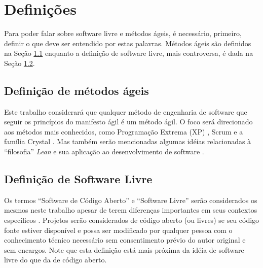 \chapter{Definições}
\label{cap:definicoes}

Para poder falar sobre software livre e métodos ágeis, é necessário,
primeiro, definir o que deve ser entendido por estas palavras. Métodos
ágeis são definidos na Seção \ref{sec:agile-def} enquanto a definição
de software livre, mais controversa, é dada na Seção \ref{sec:os-def}.

\section{Definição de métodos ágeis}
\label{sec:agile-def}

Este trabalho considerará que qualquer método de engenharia de
software que seguir os princípios do manifesto ágil
\cite{AgileManifesto} é um método ágil. O foco será direcionado aos
métodos mais conhecidos, como Programação Extrema (XP) \cite{XP02},
Scrum \cite{Schwaber2004} e a família Crystal \cite{Cockburn2002}. Mas
também serão mencionadas algumas idéias relacionadas à ``filosofia''
\emph{Lean} \cite{Ohno1998} e sua aplicação ao desenvolvimento de
software \cite{Poppendieck2005}.

\section{Definição de Software Livre}
\label{sec:os-def}

Os termos ``Software de Código Aberto'' e ``Software Livre'' serão
considerados os mesmos neste trabalho apesar de terem diferenças
importantes em seus contextos específicos \cite[Ch. 1, Free Versus
Open source]{Fogel2005}. Projetos serão considerados de código aberto
(ou livres) se seu código fonte estiver disponível e possa ser
modificado por qualquer pessoa com o conhecimento técnico necessário
sem consentimento prévio do autor original e sem encargos. Note que
esta definição está mais próxima da idéia de software livre do que da
de código aberto.

